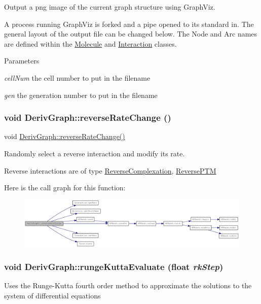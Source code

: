 Output a png image of the current graph structure using GraphViz.

A process running GraphViz is forked and a pipe opened to its standard in. The general layout of the output file can be changed below. The Node and Arc names are defined within the \hyperlink{classMolecule}{Molecule} and \hyperlink{classInteraction}{Interaction} classes.


\begin{DoxyParams}{Parameters}
\item[{\em cellNum}]the cell number to put in the filename \item[{\em gen}]the generation number to put in the filename \end{DoxyParams}
\hypertarget{classDerivGraph_aae8c58e1d6be852efbe1ed6593f31eca}{
\subsubsection[{reverseRateChange}]{\setlength{\rightskip}{0pt plus 5cm}void DerivGraph::reverseRateChange ()}}
\label{classDerivGraph_aae8c58e1d6be852efbe1ed6593f31eca}
void \hyperlink{classDerivGraph_aae8c58e1d6be852efbe1ed6593f31eca}{DerivGraph::reverseRateChange()}

Randomly select a reverse interaction and modify its rate.

Reverse interactions are of type \hyperlink{classReverseComplexation}{ReverseComplexation}, \hyperlink{classReversePTM}{ReversePTM} 

Here is the call graph for this function:\nopagebreak
\begin{figure}[H]
\begin{center}
\leavevmode
\includegraphics[width=420pt]{classDerivGraph_aae8c58e1d6be852efbe1ed6593f31eca_cgraph}
\end{center}
\end{figure}
\hypertarget{classDerivGraph_a61f768c0b7b8828b0ab129146801f628}{
\subsubsection[{rungeKuttaEvaluate}]{\setlength{\rightskip}{0pt plus 5cm}void DerivGraph::rungeKuttaEvaluate (float {\em rkStep})}}
\label{classDerivGraph_a61f768c0b7b8828b0ab129146801f628}
Uses the Runge-\/Kutta fourth order method to approximate the solutions to the system of differential equations


